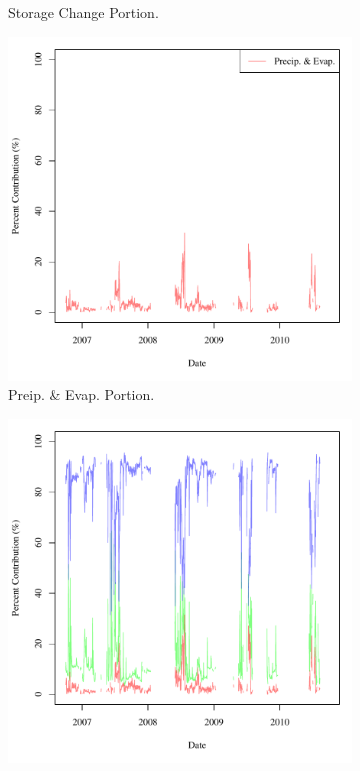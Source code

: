 \begin{figure}[htbp]
\begin{subfigure}{0.5\textwidth}
		\caption{Storage Change Portion.}
	\end{subfigure}
	\tablevspace
	\begin{subfigure}{0.5\textwidth}
		\centering
		\includegraphics[width=\tableCustomSize]{"Figures/Results_DSR/Stochastic/M Water Contrib 2"}
		\caption{Preip. \& Evap. Portion.}
	\end{subfigure}%
	\begin{subfigure}{0.5\textwidth}
		\centering
		\includegraphics[width=\tableCustomSize]{"Figures/Results_DSR/Stochastic/M Water Contrib 4"}

\end{subfigure}
\end{figure}

